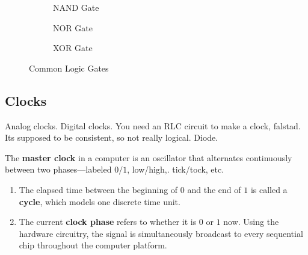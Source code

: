 \begin{figure}[H]
    \begin{subfigure}[b]{0.32\textwidth}
      \centering
      \caption{NAND Gate}
      \label{fig:nand}
    \end{subfigure}
    \hfill 
    \begin{subfigure}[b]{0.32\textwidth}
      \centering
      \caption{NOR Gate}
      \label{fig:nor}
    \end{subfigure}
    \hfill 
    \begin{subfigure}[b]{0.32\textwidth}
      \centering
      \caption{XOR Gate}
      \label{fig:xor}
    \end{subfigure}
    \caption{Common Logic Gates}
    \label{fig:logic-gates}    
  \end{figure}

\subsection{Clocks}

  Analog clocks. Digital clocks. 
  You need an RLC circuit to make a clock, falstad. 
  Its supposed to be consistent, so not really logical. Diode.

  \begin{definition}[Clock] 
    The \textbf{master clock} in a computer is an oscillator that alternates continuously between two phases---labeled $0/1$, low/high,. tick/tock, etc. 
    \begin{enumerate}
      \item The elapsed time between the beginning of $0$ and the end of $1$ is called a \textbf{cycle}, which models one discrete time unit. 
      \item The current \textbf{clock phase} refers to whether it is $0$ or $1$ now. Using the hardware circuitry, the signal is simultaneously broadcast to every sequential chip throughout the computer platform. 
    \end{enumerate}
  \end{definition}


